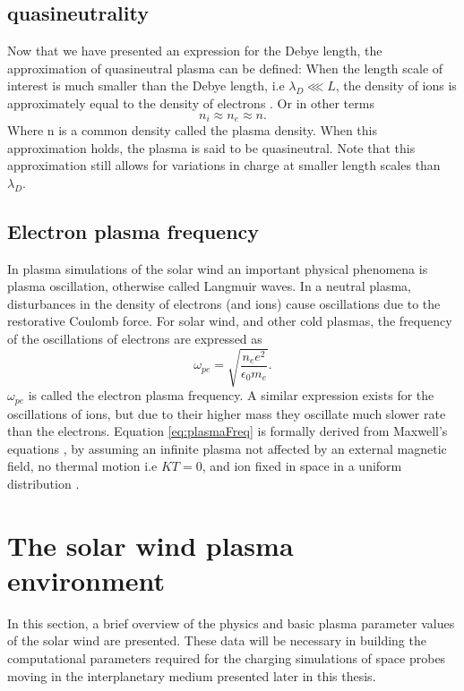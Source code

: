 \subsection{quasineutrality}
Now that we have presented an expression for the Debye length, the approximation of quasineutral plasma can be defined: When the length scale of interest is much smaller than the Debye length, i.e $\lambda_D \lll L$, the density of ions is approximately equal to the density of electrons \parencite[Section 1.4]{Chen2018}. Or in other terms
\begin{equation}
    n_i \approx n_e \approx n.
\end{equation}
Where n is a common density called the plasma density. When this approximation holds, the plasma is said to be quasineutral. Note that this approximation still allows for variations in charge at smaller length scales than $\lambda_D$. 

\subsection{Electron plasma frequency}
In plasma simulations of the solar wind an important physical phenomena is plasma oscillation, otherwise called Langmuir waves. In a neutral plasma, disturbances in the density of electrons (and ions) cause oscillations due to the restorative Coulomb force. For solar wind, and other cold plasmas, the frequency of the oscillations of electrons are expressed as
\begin{equation}\label{eq:plasmaFreq}
    \omega_{pe} = \sqrt{\frac{n_e e^2}{\epsilon_0 m_e}}.
\end{equation}
$\omega_{pe}$ is called the electron plasma frequency. A similar expression exists for the oscillations of ions, but due to their higher mass they oscillate much slower rate than the electrons. Equation \eqref{eq:plasmaFreq} is formally derived from Maxwell's equations \parencite{Fitzpatrick2015}, \parencite{HutchinsonIanH2002Popd} by assuming an infinite plasma not affected by an external magnetic field, no thermal motion i.e $KT = 0$, and ion fixed in space  in a uniform distribution \parencite[Section 4.3]{Chen2018}.

\section{The solar wind plasma environment}
In this section, a brief overview of the physics and basic plasma parameter values of the solar wind are presented. These data will be necessary in building the computational parameters required for the charging simulations of space probes moving in the interplanetary medium presented later in this thesis.

